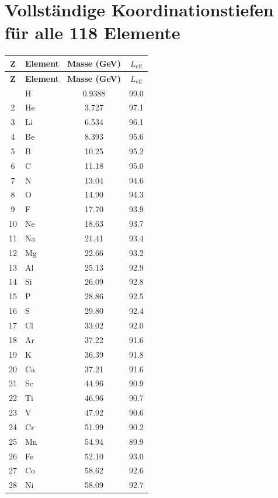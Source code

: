 \documentclass[11pt,a4paper]{article}
\begin{document}
	\section*{Vollständige Koordinationstiefen für alle 118 Elemente}
	\label{sec:full_Leff}
	\begin{longtable}{c l c c}
		\toprule
		\textbf{Z} & \textbf{Element} & \textbf{Masse (GeV)} & \textbf{\(L_{\mathrm{eff}}\)} \\
		\midrule
		\endfirsthead
		\toprule
		\textbf{Z} & \textbf{Element} & \textbf{Masse (GeV)} & \textbf{\(L_{\mathrm{eff}}\)} \\
		\midrule
		\endhead
		\bottomrule
		\endfoot
		1  & H   & 0.9388 & 99.0 \\
		2  & He  & 3.727  & 97.1 \\
		3  & Li  & 6.534  & 96.1 \\
		4  & Be  & 8.393  & 95.6 \\
		5  & B   & 10.25  & 95.2 \\
		6  & C   & 11.18  & 95.0 \\
		7  & N   & 13.04  & 94.6 \\
		8  & O   & 14.90  & 94.3 \\
		9  & F   & 17.70  & 93.9 \\
		10 & Ne  & 18.63  & 93.7 \\
		11 & Na  & 21.41  & 93.4 \\
		12 & Mg  & 22.66  & 93.2 \\
		13 & Al  & 25.13  & 92.9 \\
		14 & Si  & 26.09  & 92.8 \\
		15 & P   & 28.86  & 92.5 \\
		16 & S   & 29.80  & 92.4 \\
		17 & Cl  & 33.02  & 92.0 \\
		18 & Ar  & 37.22  & 91.6 \\
		19 & K   & 36.39  & 91.8 \\
		20 & Ca  & 37.21  & 91.6 \\
		21 & Sc  & 44.96  & 90.9 \\
		22 & Ti  & 46.96  & 90.7 \\
		23 & V   & 47.92  & 90.6 \\
		24 & Cr  & 51.99  & 90.2 \\
		25 & Mn  & 54.94  & 89.9 \\
		26 & Fe  & 52.10  & 93.0 \\
		27 & Co  & 58.62  & 92.6 \\
		28 & Ni  & 58.09  & 92.7 \\

\end{longtable}
\end{document}
